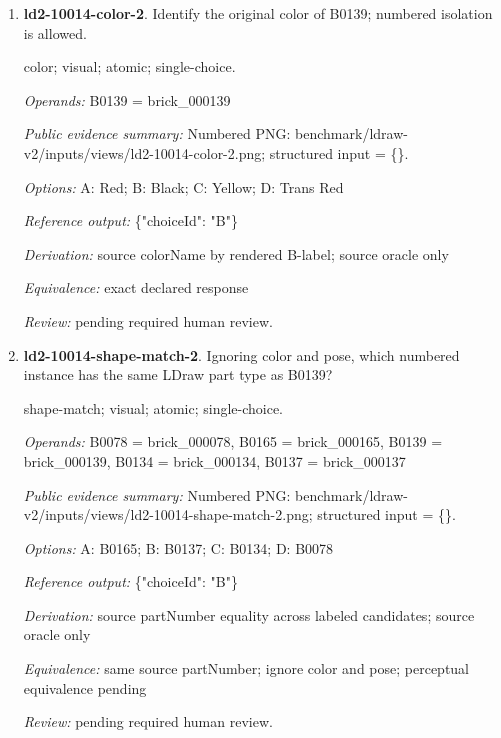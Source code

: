 \begin{enumerate}
\par{\small distance; source-data; atomic; single-choice.\par\textit{Operands:} B0127 = brick\_000127, B0093 = brick\_000093, B0004 = brick\_000004, B0071 = brick\_000071\par\textit{Public evidence summary:} \{"coordinateFrame": "Viewer world, millimeters, Euclidean distance", "centers": \{"B0093": [-4, 2.4, 4], "B0127": [62, 9.6, 0], "B0071": [-12, 18.4, 8], "B0004": [-20, 34.4, -20]\}\}\par\textit{Options:} A: B0004; B: B0127; C: B0071\par\textit{Reference output:} \{"choiceId": "C"\}\par\textit{Derivation:} Euclidean norm from public rounded centers\par\textit{Equivalence:} exact declared response\par\textit{Review:} machine checks passed; no human certification.}
\item \textbf{ld2-10014-color-2}. Identify the original color of B0139; numbered isolation is allowed.
\par{\small color; visual; atomic; single-choice.\par\textit{Operands:} B0139 = brick\_000139\par\textit{Public evidence summary:} Numbered PNG: benchmark/ldraw-v2/inputs/views/ld2-10014-color-2.png; structured input = \{\}.\par\textit{Options:} A: Red; B: Black; C: Yellow; D: Trans Red\par\textit{Reference output:} \{"choiceId": "B"\}\par\textit{Derivation:} source colorName by rendered B-label; source oracle only\par\textit{Equivalence:} exact declared response\par\textit{Review:} pending required human review.}
\item \textbf{ld2-10014-shape-match-2}. Ignoring color and pose, which numbered instance has the same LDraw part type as B0139?
\par{\small shape-match; visual; atomic; single-choice.\par\textit{Operands:} B0078 = brick\_000078, B0165 = brick\_000165, B0139 = brick\_000139, B0134 = brick\_000134, B0137 = brick\_000137\par\textit{Public evidence summary:} Numbered PNG: benchmark/ldraw-v2/inputs/views/ld2-10014-shape-match-2.png; structured input = \{\}.\par\textit{Options:} A: B0165; B: B0137; C: B0134; D: B0078\par\textit{Reference output:} \{"choiceId": "B"\}\par\textit{Derivation:} source partNumber equality across labeled candidates; source oracle only\par\textit{Equivalence:} same source partNumber; ignore color and pose; perceptual equivalence pending\par\textit{Review:} pending required human review.}

\end{enumerate}

